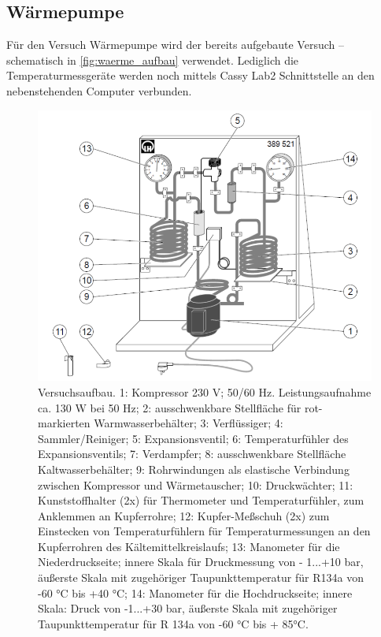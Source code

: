 \documentclass[english, ngerman]{scrartcl}
\begin{document}
\subsection{Wärmepumpe}
\label{subsec:waermepumpe}
Für den Versuch Wärmepumpe wird der bereits aufgebaute Versuch -- schematisch in \autoref{fig:waerme_aufbau} verwendet. Lediglich die Temperaturmessgeräte werden noch mittels Cassy Lab2 Schnittstelle an den nebenstehenden Computer verbunden. 
\begin{figure}[H]
    \centering
    \begin{samepage}
        \includegraphics[width=0.8\linewidth]{fig/Waermepumpe_schematisch.png}
        \caption[Schematischer Aufbau Wärmepumpe]{Versuchsaufbau. 1: Kompressor 230 V; 50/60 Hz. Leistungsaufnahme ca. 130 W bei
        50 Hz; 2: ausschwenkbare Stellfläche für rot-markierten Warmwasserbehälter; 3: Verflüssiger; 4:
        Sammler/Reiniger; 5: Expansionsventil; 6: Temperaturfühler des Expansionsventils; 7: Verdampfer; 8: ausschwenkbare Stellfläche Kaltwasserbehälter; 9: Rohrwindungen als elastische Verbindung zwischen Kompressor und Wärmetauscher; 10: Druckwächter; 11: Kunststoffhalter (2x) für
        Thermometer und Temperaturfühler, zum Anklemmen an Kupferrohre; 12: Kupfer-Meßschuh (2x)
        zum Einstecken von Temperaturfühlern für Temperaturmessungen an den Kupferrohren des Kältemittelkreislaufs; 13: Manometer für die Niederdruckseite; innere Skala für Druckmessung von -
        1...+10 bar, äußerste Skala mit zugehöriger Taupunkttemperatur für R134a von -60 °C bis +40 °C;
        14: Manometer für die Hochdruckseite; innere Skala: Druck von -1...+30 bar, äußerste Skala mit
        zugehöriger Taupunkttemperatur für R 134a von -60 °C bis + 85°C. \cite{ref:angabe_waerme}}
        \label{fig:waerme_aufbau}
    \end{samepage}
\end{figure}
\end{document}
